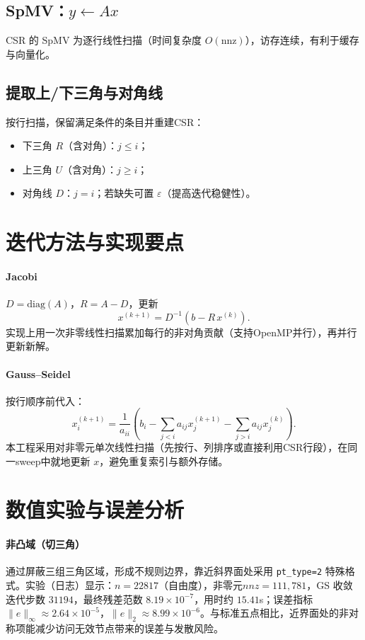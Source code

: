 \documentclass[11pt,a4paper]{article}
\begin{document}
\subsection{SpMV：$y \leftarrow Ax$}
CSR 的 SpMV 为逐行线性扫描（时间复杂度 $O(\text{nnz})$），访存连续，有利于缓存与向量化。

\subsection{提取上/下三角与对角线}
按行扫描，保留满足条件的条目并重建CSR：
\begin{itemize}
  \item 下三角 $R$（含对角）：$j\le i$；
  \item 上三角 $U$（含对角）：$j\ge i$；
  \item 对角线 $D$：$j=i$；若缺失可置 $\varepsilon$（提高迭代稳健性）。
\end{itemize}

\section{迭代方法与实现要点}
\paragraph{Jacobi}
$D=\text{diag}(A)$，$R=A-D$，更新
\[
x^{(k+1)} = D^{-1}(b - R\,x^{(k)}).
\]
实现上用一次非零线性扫描累加每行的非对角贡献（支持OpenMP并行），再并行更新新解。

\paragraph{Gauss--Seidel}
按行顺序前代入：
\[
x_i^{(k+1)}=\frac{1}{a_{ii}}\!\left(b_i-\sum_{j<i}a_{ij}x_j^{(k+1)}-\sum_{j>i}a_{ij}x_j^{(k)}\right).
\]
本工程采用对非零元单次线性扫描（先按行、列排序或直接利用CSR行段），在同一sweep中就地更新 $x$，避免重复索引与额外存储。

\section{数值实验与误差分析}
\paragraph{非凸域（切三角）}
通过屏蔽三组三角区域，形成不规则边界，靠近斜界面处采用 \texttt{pt\_type=2} 特殊格式。实验（日志）显示：$n=22817$（自由度），非零元$nnz=111{,}781$，GS 收敛迭代步数 $31194$，最终残差范数 $8.19\times 10^{-7}$，用时约 $15.41$s；误差指标 $\|e\|_\infty \approx 2.64\times 10^{-5}$，$\|e\|_{2} \approx 8.99\times 10^{-6}$。与标准五点相比，近界面处的非对称项能减少访问无效节点带来的误差与发散风险。
\end{document}
